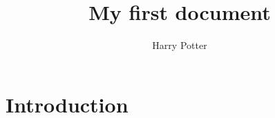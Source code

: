 \documentclass{article}
\title{My first document}
\author{Harry Potter}
\begin{document}
	\maketitle
	\section{Introduction}
\end{document}
